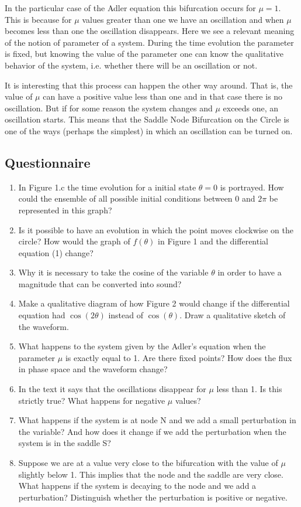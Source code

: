 \documentclass{article}
\begin{document}
In the particular case of the Adler equation this bifurcation occurs for $\mu=1$. 
This is because for $\mu$ values greater than one we have an oscillation and when $\mu$ becomes less than one the oscillation disappears. 
Here we see a relevant meaning of the notion of parameter of a system. 
During the time evolution the parameter is fixed, but knowing the value of the parameter one can know the qualitative behavior of the system, i.e. whether there will be an oscillation or not.

It is interesting that this process can happen the other way around. 
That is, the value of $\mu$ can have a positive value less than one and in that case there is no oscillation. But if for some reason the system changes and $\mu$ exceeds one, an oscillation starts. 
This means that the Saddle Node Bifurcation on the Circle is one of the ways (perhaps the simplest) in which an oscillation can be turned on. 

\subsection{Questionnaire}
\begin{enumerate}
    \item In Figure 1.c the time evolution for a initial state $\theta=0$ is portrayed. How could the ensemble of all possible initial conditions between 0 and $2\pi$ be represented in this graph?
    \item Is it possible to have an evolution in which the point moves clockwise on the circle? How would the graph of $f(\theta)$ in Figure 1 and the differential equation (1) change?
    \item Why it is necessary to take the cosine of the variable $\theta$ in order to have a magnitude that can be converted into sound?
    \item Make a qualitative diagram of how Figure 2 would change if the differential equation had $\cos(2\theta)$ instead of $\cos(\theta)$. Draw a qualitative sketch of the waveform.
    \item What happens to the system given by the Adler's equation when the parameter $\mu$ is exactly equal to 1. Are there fixed points? How does the flux in phase space and the waveform change?
    \item In the text it says that the oscillations disappear for $\mu$ less than 1. Is this strictly true? What happens for negative $\mu$ values?
    \item What happens if the system is at node N and we add a small perturbation in the variable? And how does it change if we add the perturbation when the system is in the saddle S? 
    \item Suppose we are at a value very close to the bifurcation with the value of $\mu$ slightly below 1. This implies that the node and the saddle are very close. What happens if the system is decaying to the node and we add a perturbation? Distinguish whether the perturbation is positive or negative.
\end{enumerate}
\end{document}
